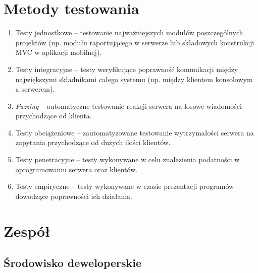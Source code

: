 \documentclass[10pt,a4paper]{article}
\begin{document}
\section{Metody testowania}

\begin{enumerate}
    \item Testy jednostkowe -- testowanie najważniejszych modułów poszczególnych projektów (np. modułu raportującego w serwerze lub składowych konstrukcji MVC w aplikacji mobilnej).
    \item Testy integracyjne -- testy weryfikujące poprawność komunikacji między największymi składnikami całego systemu (np. między klientem konsolowym a serwerem).
    \item \textit{Fuzzing} -- automatyczne testowanie reakcji serwera na losowe wiadomości przychodzące od klienta.
    \item Testy obciążeniowe -- zautomatyzowane testowanie wytrzymałości serwera na zapytania przychodzące od dużych ilości klientów.
    \item Testy penetracyjne -- testy wykonywane w celu znalezienia podatności w oprogramowaniu serwera oraz klientów.
    \item Testy empiryczne -- testy wykonywane w czasie prezentacji programów dowodzące poprawności ich działania.
\end{enumerate}

\section{Zespół}

\subsection{Środowisko deweloperskie}
\end{document}
